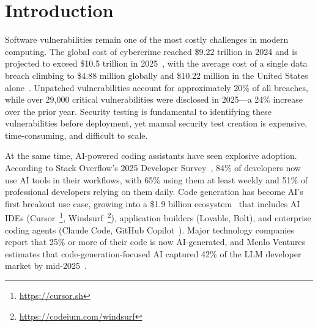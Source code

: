\documentclass[sigconf,anonymous,review]{acmart}
\begin{document}



\maketitle

\section{Introduction}

Software vulnerabilities remain one of the most costly challenges in modern computing. The global cost of cybercrime reached \$9.22 trillion in 2024 and is projected to exceed \$10.5 trillion in 2025~\cite{cybersecventures2025}, with the average cost of a single data breach climbing to \$4.88 million globally and \$10.22 million in the United States alone~\cite{ibm2024breach}. Unpatched vulnerabilities account for approximately 20\% of all breaches, while over 29,000 critical vulnerabilities were disclosed in 2025---a 24\% increase over the prior year. Security testing is fundamental to identifying these vulnerabilities before deployment, yet manual security test creation is expensive, time-consuming, and difficult to scale.

At the same time, AI-powered coding assistants have seen explosive adoption. According to Stack Overflow's 2025 Developer Survey~\cite{stackoverflow2025survey}, 84\% of developers now use AI tools in their workflows, with 65\% using them at least weekly and 51\% of professional developers relying on them daily. Code generation has become AI's first breakout use case, growing into a \$1.9 billion ecosystem~\cite{menlo2025llm} that includes AI IDEs (Cursor~\footnote{\url{https://cursor.sh}}, Windsurf~\footnote{\url{https://codeium.com/windsurf}}), application builders (Lovable, Bolt), and enterprise coding agents (Claude Code, GitHub Copilot~\cite{pearce2022asleep}). Major technology companies report that 25\% or more of their code is now AI-generated, and Menlo Ventures estimates that code-generation-focused AI captured 42\% of the LLM developer market by mid-2025~\cite{menlo2025llm}.
\end{document}

